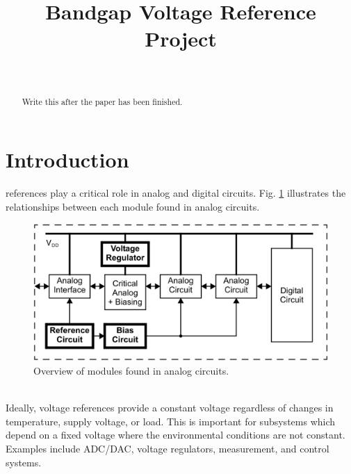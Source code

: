 \documentclass[conference]{IEEEtran}
\begin{document}
%
\title{Bandgap Voltage Reference Project}

\author{
\\
\and
{}
\and
{}
}

\maketitle

\begin{abstract}
Write this after the paper has been finished.
\end{abstract}
\IEEEpeerreviewmaketitle

\section{Introduction}
 references play a critical role in analog and digital circuits.  Fig. \ref{fig:overview} illustrates the relationships between each module found in analog circuits.
\begin{figure}[!htbp]
  \centering
  \includegraphics[scale=0.25]{images/overview.png}
  \caption[Overview]{Overview of modules found in analog circuits.\footnotemark}
  \label{fig:overview}
\end{figure}
\\Ideally, voltage references provide a constant voltage regardless of changes in temperature, supply voltage, or load.  This is important for subsystems which depend on a fixed voltage where the environmental conditions are not constant.  Examples include ADC/DAC, voltage regulators, measurement, and control systems.
\end{document}
